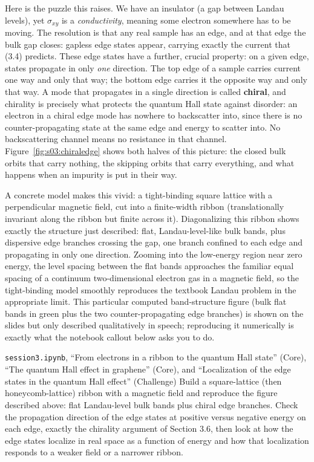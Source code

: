 Here is the puzzle this raises. We have an insulator (a gap between Landau levels), yet $\sigma_{xy}$
is a \emph{conductivity}, meaning some electron somewhere has to be moving. The resolution is that any
real sample has an edge, and at that edge the bulk gap closes: gapless edge states appear, carrying
exactly the current that (3.4) predicts. These edge states have a further, crucial property: on a
given edge, states propagate in only \emph{one} direction. The top edge of a sample carries current one
way and only that way; the bottom edge carries it the opposite way and only that way. A mode that
propagates in a single direction is called \textbf{chiral}, and chirality is precisely what protects the
quantum Hall state against disorder: an electron in a chiral edge mode has nowhere to backscatter
into, since there is no counter-propagating state at the same edge and energy to scatter into. No
backscattering channel means no resistance in that channel. Figure~\ref{fig:s03:chiraledge} shows
both halves of this picture: the closed bulk orbits that carry nothing, the skipping orbits that
carry everything, and what happens when an impurity is put in their way.



A concrete model makes this vivid: a tight-binding square lattice with a perpendicular magnetic
field, cut into a finite-width ribbon (translationally invariant along the ribbon but finite across
it). Diagonalizing this ribbon shows exactly the structure just described: flat, Landau-level-like
bulk bands, plus dispersive edge branches crossing the gap, one branch confined to each edge and
propagating in only one direction. Zooming into the low-energy region near zero energy, the level
spacing between the flat bands approaches the familiar equal spacing of a continuum two-dimensional
electron gas in a magnetic field, so the tight-binding model smoothly reproduces the textbook Landau
problem in the appropriate limit. This particular computed band-structure figure (bulk flat bands in
green plus the two counter-propagating edge branches) is shown on the slides but only described
qualitatively in speech; reproducing it numerically is exactly what the notebook callout below asks
you to do.

\begin{notebookbox}{\texttt{session3.ipynb}, ``From electrons in a ribbon to the quantum Hall state'' (Core), ``The quantum Hall effect in graphene'' (Core), and ``Localization of the edge states in the quantum Hall effect'' (Challenge)}
Build a square-lattice (then honeycomb-lattice) ribbon with a magnetic field and reproduce the
figure described above: flat Landau-level bulk bands plus chiral edge branches. Check the
propagation direction of the edge states at positive versus negative energy on each edge, exactly
the chirality argument of Section 3.6, then look at how the edge states localize in real space as
a function of energy and how that localization responds to a weaker field or a narrower ribbon.
\end{notebookbox}


